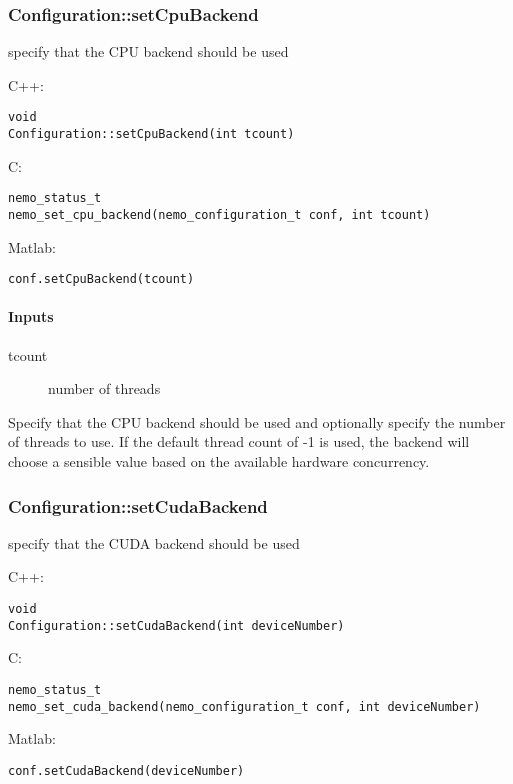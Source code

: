 \subsubsection*{Configuration::setCpuBackend}
\label{fn: setCpuBackend}
specify that the CPU backend should be used


\noindent C++:
\begin{lstlisting}[aboveskip=2pt]
void
Configuration::setCpuBackend(int tcount)
\end{lstlisting}

\noindent C:
\begin{lstlisting}[aboveskip=2pt]
nemo_status_t
nemo_set_cpu_backend(nemo_configuration_t conf, int tcount)
\end{lstlisting}

\noindent Matlab:
\begin{lstlisting}[aboveskip=2pt]
conf.setCpuBackend(tcount)
\end{lstlisting}
\paragraph{Inputs}
\begin{description}
\item[tcount] number of threads
\end{description}
Specify that the CPU backend should be used and optionally specify the number of threads to use. If the default thread count of -1 is used, the backend will choose a sensible value based on the available hardware concurrency.

\clearpage
\subsubsection*{Configuration::setCudaBackend}
\label{fn: setCudaBackend}
specify that the CUDA backend should be used


\noindent C++:
\begin{lstlisting}[aboveskip=2pt]
void
Configuration::setCudaBackend(int deviceNumber)
\end{lstlisting}

\noindent C:
\begin{lstlisting}[aboveskip=2pt]
nemo_status_t
nemo_set_cuda_backend(nemo_configuration_t conf, int deviceNumber)
\end{lstlisting}

\noindent Matlab:
\begin{lstlisting}[aboveskip=2pt]
conf.setCudaBackend(deviceNumber)
\end{lstlisting}
